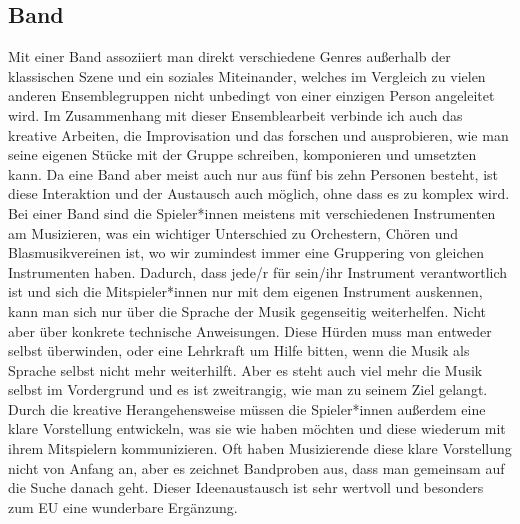 \subsection{Band}
Mit einer Band assoziiert man direkt verschiedene Genres außerhalb der
klassischen Szene und ein soziales Miteinander, welches im Vergleich zu vielen
anderen Ensemblegruppen nicht unbedingt von einer einzigen Person angeleitet
wird. Im Zusammenhang mit dieser Ensemblearbeit verbinde ich auch das kreative
Arbeiten, die Improvisation und das forschen und ausprobieren, wie man seine
eigenen Stücke mit der Gruppe schreiben, komponieren und umsetzten kann. Da eine
Band aber meist auch nur aus fünf bis zehn Personen besteht, ist diese
Interaktion und der Austausch auch möglich, ohne dass es zu komplex wird. Bei
einer Band sind die Spieler*innen meistens mit verschiedenen Instrumenten am
Musizieren, was ein wichtiger Unterschied zu Orchestern, Chören und
Blasmusikvereinen ist, wo wir zumindest immer eine Gruppering von gleichen
Instrumenten haben. Dadurch, dass jede/r für sein/ihr Instrument verantwortlich
ist und sich die Mitspieler*innen nur mit dem eigenen Instrument auskennen, kann
man sich nur über die Sprache der Musik gegenseitig weiterhelfen. Nicht aber
über konkrete technische Anweisungen. Diese Hürden muss man entweder selbst
überwinden, oder eine Lehrkraft um Hilfe bitten, wenn die Musik als Sprache
selbst nicht mehr weiterhilft. Aber es steht auch viel mehr die Musik
selbst im Vordergrund und es ist zweitrangig, wie man zu seinem Ziel gelangt.
Durch die kreative Herangehensweise müssen die Spieler*innen außerdem eine klare
Vorstellung entwickeln, was sie wie haben möchten und diese wiederum mit ihrem
Mitspielern kommunizieren. Oft haben Musizierende diese klare Vorstellung nicht
von Anfang an, aber es zeichnet Bandproben aus, dass man gemeinsam auf die Suche
danach geht. Dieser Ideenaustausch ist sehr wertvoll und besonders
zum EU eine wunderbare Ergänzung.



